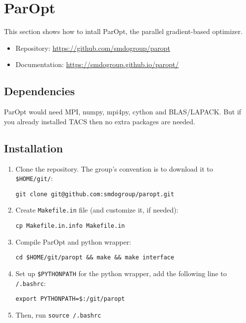 \documentclass{article}
\begin{document}
\section{ParOpt}

This section shows how to intall ParOpt, the parallel gradient-based optimizer.

\begin{itemize}
    \item Repository: \href{https://github.com/smdogroup/paropt}{https://github.com/smdogroup/paropt}
    \item Documentation: \href{https://smdogroup.github.io/paropt/}{https://smdogroup.github.io/paropt/}
\end{itemize}

\subsection{Dependencies}

ParOpt would need MPI, numpy, mpi4py, cython and BLAS/LAPACK. But if you already
installed TACS then no extra packages are needed.

\subsection{Installation}

\begin{enumerate}

    \item Clone the repository. The group's convention is to download it to
    \texttt{\$HOME/git/}:

    \texttt{git clone git@github.com:smdogroup/paropt.git}

    \item Create \texttt{Makefile.in} file (and customize it, if needed):

    \texttt{cp Makefile.in.info Makefile.in}

    \item Compile ParOpt and python wrapper:

    \texttt{cd \$HOME/git/paropt \&\& make \&\& make interface}

    \item Set up \texttt{\$PYTHONPATH} for the python wrapper, add the following line to \texttt{\texttildelow/.bashrc}:

    \texttt{export PYTHONPATH=\$:\texttildelow/git/paropt}

    \item Then, run \texttt{source \texttildelow/.bashrc}

\end{enumerate}
\end{document}

